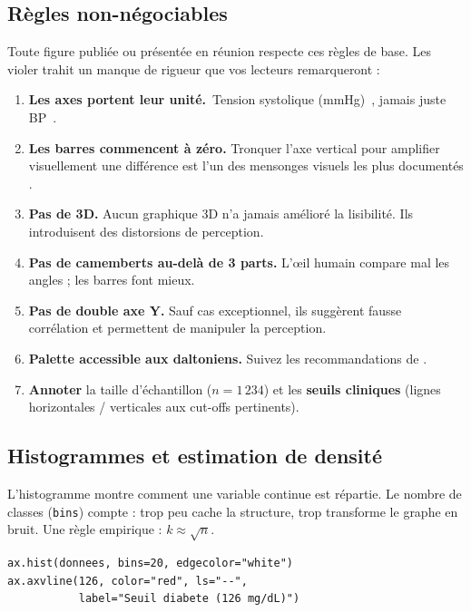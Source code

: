 \documentclass[11pt,a4paper]{article}
\providecommand{\og}{\guillemotleft\,}
\providecommand{\fg}{\,\guillemotright}
\begin{document}
\subsection{R\`egles non-n\'egociables}

Toute figure publi\'ee ou pr\'esent\'ee en r\'eunion respecte ces r\`egles
de base. Les violer trahit un manque de rigueur que vos lecteurs
remarqueront :

\begin{enumerate}
  \item \textbf{Les axes portent leur unit\'e.} \og Tension systolique
        (mmHg) \fg{}, jamais juste \og BP \fg{}.
  \item \textbf{Les barres commencent \`a z\'ero.} Tronquer l'axe
        vertical pour amplifier visuellement une diff\'erence est l'un
        des mensonges visuels les plus document\'es \citep{tufte2001}.
  \item \textbf{Pas de 3D.} Aucun graphique 3D n'a jamais am\'elior\'e la
        lisibilit\'e. Ils introduisent des distorsions de perception.
  \item \textbf{Pas de camemberts au-del\`a de 3 parts.} L'\oe il humain
        compare mal les angles ; les barres font mieux.
  \item \textbf{Pas de double axe Y.} Sauf cas exceptionnel, ils
        sugg\`erent fausse corr\'elation et permettent de manipuler la
        perception.
  \item \textbf{Palette accessible aux daltoniens.} Suivez les
        recommandations de \citet{wong2011points}.
  \item \textbf{Annoter} la taille d'\'echantillon ($n = 1\,234$) et les
        \textbf{seuils cliniques} (lignes horizontales / verticales aux
        cut-offs pertinents).
\end{enumerate}

\subsection{Histogrammes et estimation de densit\'e}

L'histogramme montre comment une variable continue est r\'epartie. Le
nombre de classes (\texttt{bins}) compte : trop peu cache la structure,
trop transforme le graphe en bruit. Une r\`egle empirique :
$k \approx \sqrt{n}$.

\begin{verbatim}
ax.hist(donnees, bins=20, edgecolor="white")
ax.axvline(126, color="red", ls="--",
           label="Seuil diabete (126 mg/dL)")
\end{verbatim}
\end{document}
